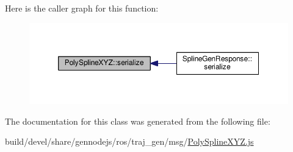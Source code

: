 Here is the caller graph for this function\+:
\nopagebreak
\begin{figure}[H]
\begin{center}
\leavevmode
\includegraphics[width=350pt]{class_poly_spline_x_y_z_a893425ffcaa6422399986ef9c54a4143_icgraph}
\end{center}
\end{figure}




The documentation for this class was generated from the following file\+:\begin{DoxyCompactItemize}
\item 
build/devel/share/gennodejs/ros/traj\+\_\+gen/msg/\hyperlink{_poly_spline_x_y_z_8js}{Poly\+Spline\+X\+Y\+Z.\+js}\end{DoxyCompactItemize}
